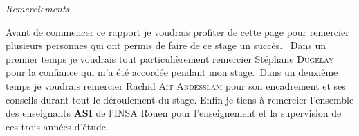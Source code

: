 \vspace{\fill}

\begin{frame}
    \centering \Huge
    \emph{Remerciements}    
\end{frame}

\begin{center}
    \LARGE
    Avant de commencer ce rapport je voudrais profiter de cette page pour remercier plusieurs personnes qui ont permis de faire de ce stage un succès. \newline \newline
    Dans un premier temps je voudrais tout particulièrement remercier Stéphane \textsc{Dugelay} pour la confiance qui m'a été accordée pendant mon stage. \newline \newline Dans un deuxième temps je voudrais remercier Rachid \textsc{Ait Abdesslam} pour son encadrement et ses conseils durant tout le déroulement du stage. \newline \newline
    Enfin je tiens à remercier l'ensemble des enseignants \textbf{ASI} de l'INSA Rouen pour l'enseignement et la supervision de ces trois années d'étude.    
\end{center}
\vspace{\fill}
